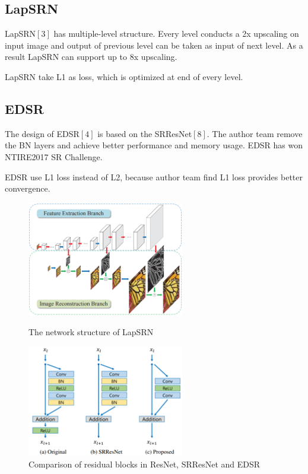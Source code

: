 \documentclass{article}
\begin{document}
  \subsection{LapSRN}
  LapSRN$[3]$ has multiple-level structure. Every level conducts a 2x upscaling on input 
  image and output of previous level can be taken as input of next level. As a result LapSRN can support up to 8x upscaling. 
  
  LapSRN take L1 as loss, which is optimized at end of every level.
  
  \subsection{EDSR}
  The design of EDSR$[4]$ is based on the SRResNet$[8]$. 
  The author team remove the BN layers and achieve better performance and memory usage. 
  EDSR has won NTIRE2017 SR Challenge.

  EDSR use L1 loss instead of L2, because author team find L1 loss provides better convergence.
  
  \begin{figure}[H]
    \begin{minipage}[H]{0.5\linewidth}
    \centering
    \includegraphics[width=2.7in]{images/LapSRN.png}
    \caption{The network structure of LapSRN}

    \end{minipage}
    \begin{minipage}[H]{0.5\linewidth}
    \centering
    \includegraphics[width=2.7in]{images/EDSR1.png}
    \caption{Comparison of residual blocks in ResNet, SRResNet and EDSR}

    \end{minipage}
\end{figure}
\end{document}
